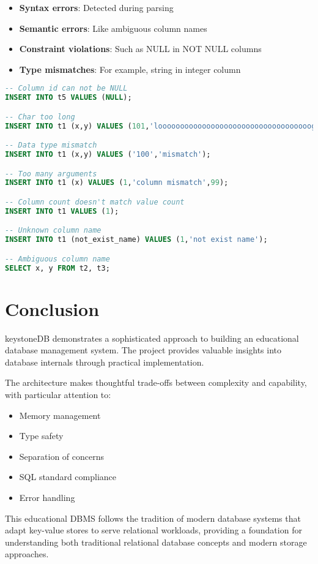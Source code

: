 \documentclass[12pt,a4paper]{article}
\begin{document}
\begin{itemize}
    \item \textbf{Syntax errors}: Detected during parsing
    \item \textbf{Semantic errors}: Like ambiguous column names
    \item \textbf{Constraint violations}: Such as NULL in NOT NULL columns
    \item \textbf{Type mismatches}: For example, string in integer column
\end{itemize}

\begin{lstlisting}[language=SQL,caption=Examples of error cases]
-- Column id can not be NULL
INSERT INTO t5 VALUES (NULL);

-- Char too long
INSERT INTO t1 (x,y) VALUES (101,'looooooooooooooooooooooooooooooooooog');

-- Data type mismatch
INSERT INTO t1 (x,y) VALUES ('100','mismatch');

-- Too many arguments
INSERT INTO t1 (x) VALUES (1,'column mismatch',99);

-- Column count doesn't match value count
INSERT INTO t1 VALUES (1);

-- Unknown column name
INSERT INTO t1 (not_exist_name) VALUES (1,'not exist name');

-- Ambiguous column name
SELECT x, y FROM t2, t3;
\end{lstlisting}

\section{Conclusion}
keystoneDB demonstrates a sophisticated approach to building an educational database management system. The project provides valuable insights into database internals through practical implementation.

The architecture makes thoughtful trade-offs between complexity and capability, with particular attention to:
\begin{itemize}
    \item Memory management
    \item Type safety
    \item Separation of concerns
    \item SQL standard compliance
    \item Error handling
\end{itemize}

This educational DBMS follows the tradition of modern database systems that adapt key-value stores to serve relational workloads, providing a foundation for understanding both traditional relational database concepts and modern storage approaches.
\end{document}
